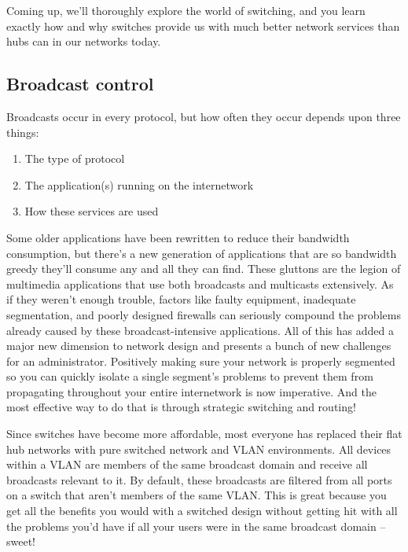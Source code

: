 \documentclass[b5paper,11pt]{memoir}
\begin{document}
Coming up, we'll thoroughly explore the world of switching, and you learn exactly how and why switches provide us with much better network services than hubs can in our networks today.



\subsection{Broadcast control}

Broadcasts occur in every protocol, but how often they occur depends upon three things:

\begin{enumerate}
   \item
      The type of protocol
   \item
      The application(s) running on the internetwork
   \item
      How these services are used
\end{enumerate}

Some older applications have been rewritten to reduce their bandwidth
consumption, but there's a new generation of applications that are so
bandwidth greedy they'll consume any and all they can find. These
gluttons are the legion of multimedia applications that use both
broadcasts and multicasts extensively. As if they weren't enough
trouble, factors like faulty equipment, inadequate segmentation, and
poorly designed firewalls can seriously compound the problems already
caused by these broadcast-intensive applications. All of this has added
a major new dimension to network design and presents a bunch of new
challenges for an administrator. Positively making sure your network is
properly segmented so you can quickly isolate a single segment's
problems to prevent them from propagating throughout your entire
internetwork is now imperative. And the most effective way to do that is
through strategic switching and routing!

Since switches have become more affordable, most everyone has replaced
their flat hub networks with pure switched network and VLAN
environments. All devices within a VLAN are members of the same
broadcast domain and receive all broadcasts relevant to it. By default,
these broadcasts are filtered from all ports on a switch that aren't
members of the same
VLAN. This is great because you get all the benefits you would with a
switched design without getting hit with all the problems you'd have if
all your users were in the same broadcast domain -- sweet!
\end{document}
